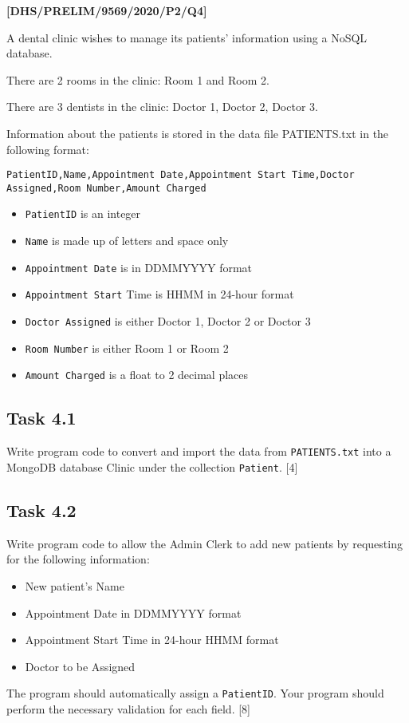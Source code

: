 \item \textbf{{[}DHS/PRELIM/9569/2020/P2/Q4{]} }

A dental clinic wishes to manage its patients' information using a
NoSQL database. 

There are 2 rooms in the clinic: Room 1 and Room 2. 

There are 3 dentists in the clinic: Doctor 1, Doctor 2, Doctor 3. 

Information about the patients is stored in the data file PATIENTS.txt
in the following format: 

\texttt{PatientID,Name,Appointment Date,Appointment Start Time,Doctor
Assigned,Room Number,Amount Charged }
\begin{itemize}
\item \texttt{PatientID} is an integer 
\item \texttt{Name} is made up of letters and space only 
\item \texttt{Appointment Date} is in DDMMYYYY format 
\item \texttt{Appointment Start} Time is HHMM in 24-hour format 
\item \texttt{Doctor Assigned} is either Doctor 1, Doctor 2 or Doctor 3 
\item \texttt{Room Number} is either Room 1 or Room 2 
\item \texttt{Amount Charged} is a float to 2 decimal places 
\end{itemize}

\subsection*{Task 4.1 }

Write program code to convert and import the data from \texttt{PATIENTS.txt}
into a MongoDB database Clinic under the collection \texttt{Patient}.
\hfill{}{[}4{]}

\subsection*{Task 4.2 }

Write program code to allow the Admin Clerk to add new patients by
requesting for the following information: 
\begin{itemize}
\item New patient's Name 
\item Appointment Date in DDMMYYYY format 
\item Appointment Start Time in 24-hour HHMM format 
\item Doctor to be Assigned 
\end{itemize}
The program should automatically assign a \texttt{PatientID}. Your
program should perform the necessary validation for each field. \hfill{}{[}8{]}


